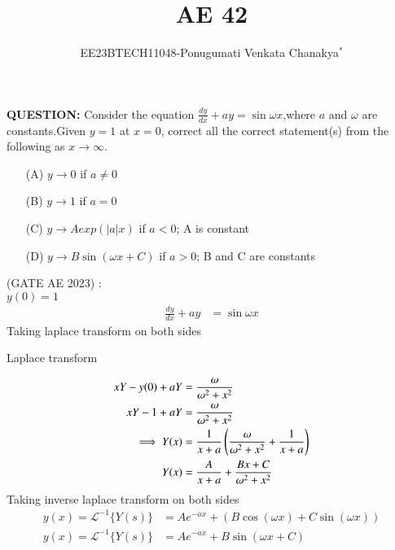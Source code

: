 \documentclass[journal,12pt,twocolumn]{IEEEtran}
\theoremstyle{remark}
\begin{document}
 
 \vspace{3cm}
 \title{\textbf{AE 42}}
 \author{EE23BTECH11048-Ponugumati Venkata Chanakya$^{*}$%
 }
 \maketitle
 \newpage
 \bigskip
 \renewcommand{\thefigure}{\theenumi}
 \renewcommand{\thetable}{\theenumi}
 \textbf{QUESTION:}
Consider the equation $\frac{dy}{dx}+ay=\sin{\omega x}$,where $a$ and $\omega$ are constants.Given $y=1$ at $x=0$, correct all the correct statement(s) from the following as $x\to \infty$.
\begin{enumerate}

  \item[(A)]  $y \to 0$ if $a \neq 0$ \\ 
  \item[(B)]  $y \to 1$ if $a = 0$\\
  \item[(C)]  $y \to Aexp(|a|x)$ if $a < 0$; A is constant\\
  \item[(D)]  $y \to B \sin(\omega x+C)$ if $a>0$; B and C are constants\\
\end{enumerate}
 \hfill(GATE AE 2023)
\solution: \\
  $y(0)=1$
\begin{align}
 \frac{dy}{dx}+ay &= \sin{\omega x}
\end{align}
 Taking laplace transform on both sides 
  \begin{table}[!ht]
    \centering
        
    \caption{Laplace transform}
    \label{tab:Gate AE 42 }
\end{table}
\begin{align}
    xY-y(0)+aY &= \frac{\omega}{\omega^2+x^2}\\
    xY-1+aY &= \frac{\omega}{\omega^2+x^2}\\
    \implies Y(x)&=\frac{1}{x+a} \left(\frac{\omega}{\omega^2+x^2}+\frac{1}{x+a}\right)\\
     Y(x)&=\frac{A}{x+a} +\frac{Bx+C}{\omega^2+x^2}
 \end{align}
 Taking inverse laplace transform on both sides 
 \begin{align}
      y(x) = \mathcal{L}^{-1}\{Y(s)\} &= A e^{-ax} + (B\cos(\omega x) + C\sin(\omega x))\\
       y(x) = \mathcal{L}^{-1}\{Y(s)\} &= A e^{-ax} + B\sin(\omega x+C)
 \end{align}
\end{document}
